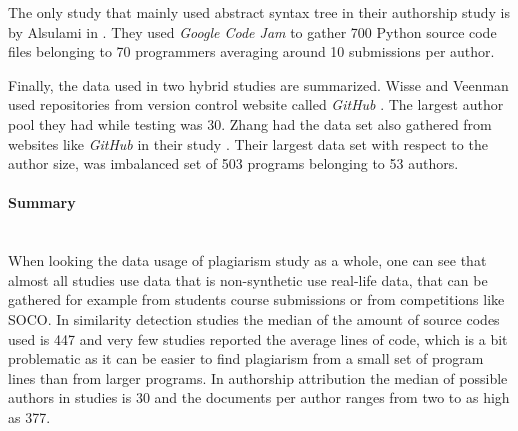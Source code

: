 The only study that mainly used abstract syntax tree in their authorship study is by Alsulami \etal in \cite{SCAANN2017}. They used \emph{Google Code Jam} to gather 700 Python source code files belonging to 70 programmers averaging around 10 submissions per author. 

Finally, the data used in two hybrid studies are summarized. Wisse and Veenman used repositories from version control website called \emph{GitHub} \cite{SDNAIJSP2015}. The largest author pool they had while testing was 30. Zhang \etal had the data set also gathered from websites like \emph{GitHub} in their study \cite{AISC2017}. Their largest data set with respect to the author size, was imbalanced set of 503 programs belonging to 53 authors. 

\paragraph{Summary}\mbox{}\\
When looking the data usage of plagiarism study as a whole, one can see that almost all studies use data that is non-synthetic \ie use real-life data, that can be gathered for example from students course submissions or from competitions like SOCO. In similarity detection studies the median of the amount of source codes used is 447 and very few studies reported the average lines of code, which is a bit problematic as it can be easier to find plagiarism from a small set of program lines than from larger programs. In authorship attribution the median of possible authors in studies is 30 and the documents per author ranges from two to as high as 377.

